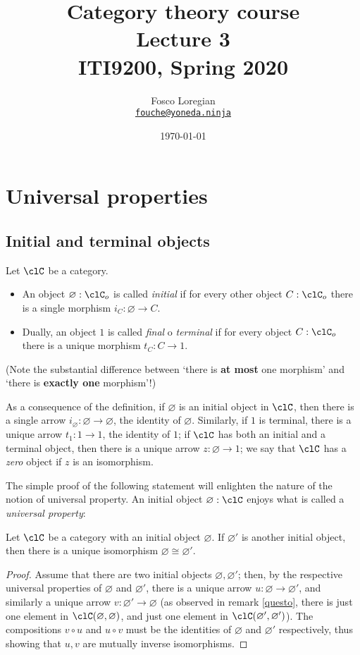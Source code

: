 \documentclass[11pt]{article}
\author{ Fosco Loregian \\
  \href{mailto:fouche@yoneda.ninja}
       {\tt fouche@yoneda.ninja}}
\date{\today}
\title{  Category theory course 
			\\ Lecture 3
			\\ ITI9200, Spring 2020
			}
\begin{document}
\maketitle
\tableofcontents
\section{Universal properties}
\subsection{Initial and terminal objects}
\begin{definition}
	Let $\clC$ be a category.
	\begin{itemize}
		\item An object $\varnothing :   \clC_o$ is called \emph{initial} if for every other object $C :   \clC_o$ there is a single morphism $i_C : \varnothing\to C$.
		\item Dually, an object $1$ is called \emph{final} o \emph{terminal} if for every object $C :   \clC_o$ there is a unique morphism $t_C : C\to 1$.
	\end{itemize}
	(Note the substantial difference between `there is \textbf{at most} one morphism' and `there is \textbf{exactly one} morphism'!)
\end{definition}
\begin{remark}
	As a consequence of the definition, if $\varnothing$ is an initial object in $\clC$, then there is a single arrow $i_\varnothing : \varnothing\to \varnothing$, the identity of $\varnothing$. Similarly, if $1$ is terminal, there is a unique arrow $t_1 : 1\to 1$, the identity of $1$; if $\clC$ has both an initial and a terminal object, then there is a unique arrow $z : \varnothing\to 1$; we say that $\clC$ has a \emph{zero} object if $z$ is an isomorphism.
\end{remark}
The simple proof of the following statement will enlighten the nature of the notion of universal property. An initial object $\varnothing : \clC$ enjoys what is called a \emph{universal property}:
\begin{remark}\label{questo}
	Let $\clC$ be a category with an initial object $\varnothing$. If $\varnothing'$ is another initial object, then there is a unique isomorphism $\varnothing\cong \varnothing'$.
\end{remark}
\begin{proof}
	Assume that there are two initial objects $\varnothing, \varnothing'$; then, by the respective universal properties of $\varnothing$ and $\varnothing'$, there is a unique arrow $u : \varnothing \to \varnothing'$, and similarly a unique arrow $v : \varnothing'\to \varnothing$ (as observed in remark \ref{questo}, there is just one element in $\clC(\varnothing,\varnothing)$, and just one element in $\clC(\varnothing',\varnothing')$). The compositions $v\circ u$ and $u\circ v$ must be the identities of $\varnothing$ and $\varnothing'$ respectively, thus showing that $u,v$ are mutually inverse isomorphisms.
\end{proof}
\end{document}
